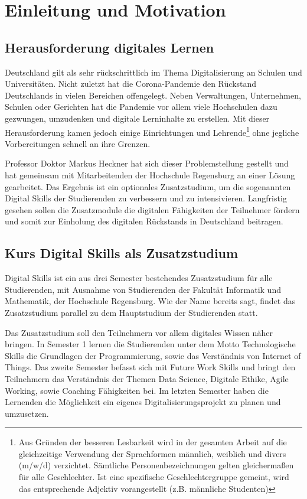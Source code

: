 \section{Einleitung und Motivation}\label{einleitung}
\subsection{Herausforderung digitales Lernen}\label{herausforderung}
Deutschland gilt als sehr rückschrittlich im Thema Digitalisierung an Schulen
und Universitäten. Nicht zuletzt hat die Corona-Pandemie den Rückstand
Deutschlands in vielen Bereichen offengelegt. Neben Verwaltungen, Unternehmen,
Schulen oder Gerichten hat die Pandemie vor allem viele Hochschulen dazu
gezwungen, umzudenken und digitale Lerninhalte zu erstellen. Mit dieser
Herausforderung kamen jedoch einige Einrichtungen und Lehrende\footnote{Aus
Gründen der besseren Lesbarkeit wird in der gesamten Arbeit auf die
gleichzeitige Verwendung der Sprachformen männlich, weiblich und divers (m/w/d)
verzichtet. Sämtliche Personenbezeichnungen gelten gleichermaßen für alle
Geschlechter. Ist eine spezifische Geschlechtergruppe gemeint, wird das
entsprechende Adjektiv vorangestellt (z.B. \glqq männliche Studenten\grqq)} ohne
jegliche Vorbereitungen schnell an ihre Grenzen. \parencite{bmwi-rueckstand}

Professor Doktor Markus Heckner hat sich dieser Problemstellung gestellt und
hat gemeinsam mit Mitarbeitenden der Hochschule Regensburg an einer Lösung
gearbeitet. Das Ergebnis ist ein optionales Zusatzstudium, um die sogenannten
\glqq Digital Skills\grqq{} der Studierenden zu verbessern und zu intensivieren.
Langfristig gesehen sollen die Zusatzmodule die digitalen Fähigkeiten der
Teilnehmer fördern und somit zur Einholung des digitalen Rückstands in
Deutschland beitragen.

\subsection{Kurs Digital Skills als Zusatzstudium}\label{kurs-digital-skills}
Digital Skills ist ein aus drei Semester bestehendes Zusatzstudium für alle
Studierenden, mit Ausnahme von Studierenden der Fakultät Informatik und
Mathematik, der Hochschule Regensburg. Wie der Name bereits sagt, findet das
Zusatzstudium parallel zu dem Hauptstudium der Studierenden statt.

Das Zusatzstudium soll den Teilnehmern vor allem digitales Wissen näher bringen.
In Semester 1 lernen die Studierenden unter dem Motto
\glqq Technologische Skills\grqq{}
die Grundlagen der Programmierung, sowie das Verständnis von Internet of Things.
Das zweite Semester befasst sich mit \glqq Future Work Skills\grqq{} und bringt
den Teilnehmern das Verständnis der Themen Data Science, Digitale Ethike, Agile
Working, sowie Coaching Fähigkeiten bei. Im letzten Semester haben die Lernenden
die Möglichkeit ein eigenes Digitalisierungsprojekt zu planen und umzusetzen.

